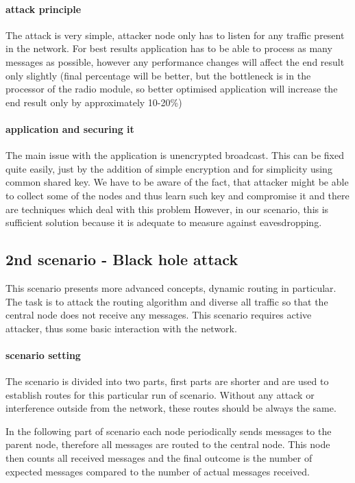 \documentclass[
  print, %
  Table,   %
  nolof,     %
  nolot,     %
           oneside
]{fithesis3}
\begin{document}
    \paragraph{attack principle}
    The attack is very simple, attacker node only has to listen for any traffic present in the network. For best results application has to be able to process as many messages as possible, however any performance changes will affect the end result only slightly (final percentage will be better, but the bottleneck is in the processor of the radio module, so better optimised application will increase the end result only by approximately 10-20\%)
    \paragraph{application and securing it}
    The main issue with the application is unencrypted broadcast. This can be fixed quite easily, just by the addition of simple encryption and for simplicity using common shared key. We have to be aware of the fact, that attacker might be able to collect some of the nodes and thus learn such key and compromise it and there are techniques which deal with this problem %
    However, in our scenario, this is sufficient solution because it is adequate to measure against eavesdropping.

    \subsection{2nd scenario - Black hole attack} \label{subsec:2nd}
    This scenario presents more advanced concepts, dynamic routing in particular. The task is to attack the routing algorithm and diverse all traffic so that the central node does not receive any messages. This scenario requires active attacker, thus some basic interaction with the network.

    \paragraph{scenario setting}
    The scenario is divided into two parts, first parts are shorter and are used to establish routes for this particular run of scenario. Without any attack or interference outside from the network, these routes should be always the same.

    In the following part of scenario each node periodically sends messages to the parent node, therefore all messages are routed to the central node. This node then counts all received messages and the final outcome is the number of expected messages compared to the number of actual messages received.
\end{document}
